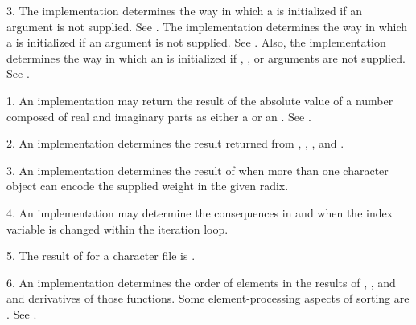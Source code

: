 \item{3.} The implementation determines the way in which a 
 is initialized if an  
argument is not supplied. See .
The implementation determines the way in which a 
 is initialized if an  
argument is not supplied. See .
Also, the implementation determines the way in which an
 is initialized if ,
, or 
arguments are not supplied. See .


\endlist
\endsubSection%

\beginlist
\item{1.}
An implementation may return the result of the absolute value of 
a  number composed of  real
and imaginary parts as either a  
or an . See .

\item{2.}
An implementation determines the result returned from 
,
,
 , and .

\item{3.} An implementation determines the result of 
when more than one character object can encode the supplied weight in
the given radix.

\item{4.} An implementation may determine the consequences in 
 and
 when the index variable is changed within the iteration
loop.

\item{5.}
The result of  for a character file
is .

\item{6.}
An implementation determines the order of elements in the results 
of ,  , and 
and derivatives of those functions.
Some element-processing aspects of sorting are .
See .

